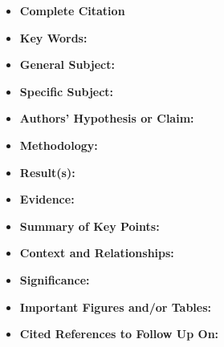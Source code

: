 \documentclass{article}
\begin{document}
\begin{itemize}
\setlength\itemsep{1em}
\item{\textbf{Complete Citation}}
\\
\cite{Chung2004}

\item{\textbf{Key Words:}} 
\\

\item{\textbf{General Subject:}}
\\

\item{\textbf{Specific Subject:}}
\\

\item{\textbf{Authors' Hypothesis or Claim:}}
\\

\item{\textbf{Methodology:}}
\\

\item{\textbf{Result(s):}}
\\

\item{\textbf{Evidence:}}
\\

\item{\textbf{Summary of Key Points:}}
\\

\item{\textbf{Context and Relationships:}}
\\

\item{\textbf{Significance:}}
\\

\item{\textbf{Important Figures and/or Tables:}}
\\

\item{\textbf{Cited References to Follow Up On:}}
\\



\end{itemize}




\end{document}
